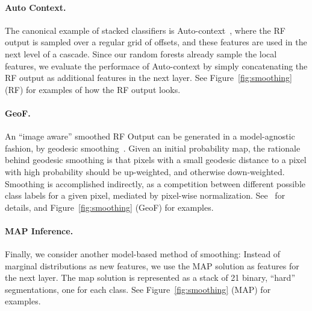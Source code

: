 \documentclass[10pt,twocolumn,letterpaper]{article}
\begin{document}
\paragraph{Auto Context. }
The canonical example of stacked classifiers is Auto-context~\cite{AutoContext2008}, where the RF output is sampled over a regular grid of offsets, and these features are used in the next level of a cascade.  Since our random forests already sample the local features, we evaluate the performace of Auto-context by simply concatenating the RF output as additional features in the next layer.  See Figure~\ref{fig:smoothing} (RF) for examples of how the RF output looks.

\paragraph{GeoF. }
An ``image aware'' smoothed RF Output can be generated in a model-agnostic fashion, by geodesic smoothing~\cite{GeoForests2013}. 
Given an initial probability map, the rationale behind geodesic smoothing is that pixels with a small geodesic distance to a pixel with high probability should be up-weighted, and otherwise down-weighted. Smoothing is accomplished indirectly, as a competition between different possible class labels for a given pixel, mediated by pixel-wise normalization. See~\cite{GeoForests2013} for details, and Figure~\ref{fig:smoothing} (GeoF) for examples.

%
%
%

\paragraph{MAP Inference. }

Finally, we consider another model-based method of smoothing: Instead of marginal distributions as new features, we use the MAP solution
as features for the next layer. The map solution is represented as a stack of 21 binary, ``hard'' segmentations, one for each class. 
See Figure~\ref{fig:smoothing} (MAP) for examples.
\end{document}
